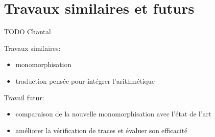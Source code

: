 \section{Travaux similaires et futurs}
\label{sec:similaires}

TODO Chantal

Travaux similaires:
\begin{itemize}
\item monomorphisation
\item traduction pensée pour intégrer l'arithmétique
\end{itemize}

Travail futur:
\begin{itemize}
\item comparaison de la nouvelle monomorphisation avec l'état de l'art
\item améliorer la vérification de traces et évaluer son efficacité
\end{itemize}
